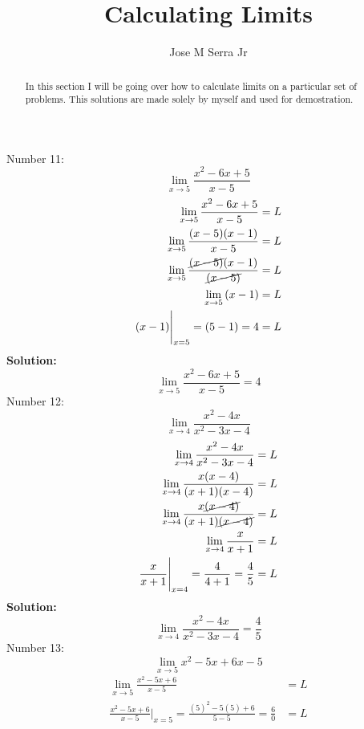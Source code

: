\documentclass{article}
\title{Calculating Limits}
\author{Jose M Serra Jr}
\begin{document}
	
	\maketitle
	\begin{abstract}
		\indent\indent In this section I will be going over how to calculate limits on a particular set of problems. This solutions are made solely by myself and used for demostration.
	\end{abstract}
	\newpage
	Number 11:
	\begin{equation*}
		\lim\limits_{x\to 5}{\frac{x^2-6x+5}{x-5}}
	\end{equation*}
	\begin{eqnarray*}
		\lim\limits_{x\to 5}{\frac{x^2-6x+5}{x-5}} &= L \\
		\lim\limits_{x\to 5}{\frac{(x-5)(x-1)}{x-5}} &= L \\
		\lim\limits_{x\to 5}{\frac{\cancel{(x-5)}(x-1)}{\cancel{(x-5)}}} &= L \\
		\lim\limits_{x\to 5}{(x-1)} &= L \\
		(x-1)\Bigg\vert_{x=5} = (5-1) = 4 &= L
	\end{eqnarray*}
	\textbf{Solution:}
	\begin{equation*}
		\lim\limits_{x\to 5}{\frac{x^2-6x+5}{x-5}}=4
	\end{equation*}
	Number 12:
	\begin{equation*}
		\lim\limits_{x\to 4}{\frac{x^2-4x}{x^2-3x-4}}
	\end{equation*}
	\begin{eqnarray*}
		\lim\limits_{x\to 4}{\frac{x^2-4x}{x^2-3x-4}} &= L \\
		\lim\limits_{x\to 4}{\frac{x(x-4)}{(x+1)(x-4)}} &= L \\
		\lim\limits_{x\to 4}{\frac{x\cancel{(x-4)}}{(x+1)\cancel{(x-4)}}} &= L \\
		\lim\limits_{x\to 4}{\frac{x}{x+1}} &= L \\
		\frac{x}{x+1}\Bigg\vert_{x=4} = \frac{4}{4+1}= \frac{4}5 &= L
	\end{eqnarray*}
	\textbf{Solution:}
	\begin{equation*}
		\lim\limits_{x\to 4}{\frac{x^2-4x}{x^2-3x-4}} = \frac45
	\end{equation*}
	Number 13:
	\begin{equation*}
		\lim\limits_{x\to 5}{x^2-5x+6}{x-5}
	\end{equation*}
	\begin{eqnarray*}
		\lim\limits_{x\to 5}{\frac{x^2-5x+6}{x-5}} &= L \\
		\frac{x^2-5x+6}{x-5}\Bigg\vert_{x=5} = \frac{(5)^2-5(5)+6}{5-5} = \frac{6}{0} &= L
	\end{eqnarray*}
\end{document}
